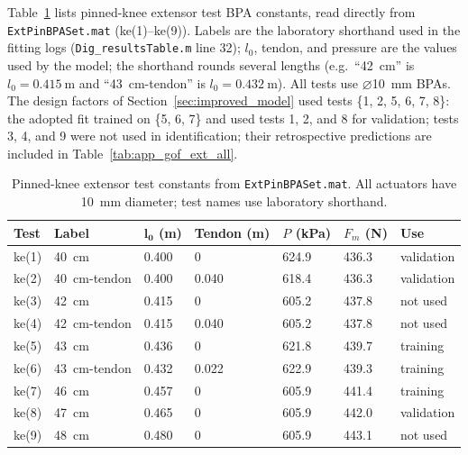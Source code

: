 Table~\ref{tab:app_extpin_tests} lists pinned-knee extensor test BPA constants, read directly from \nolinkurl{ExtPinBPASet.mat} (ke(1)--ke(9)). Labels are the laboratory shorthand used in the fitting logs (\nolinkurl{Dig_resultsTable.m} line 32); $l_{0}$, tendon, and pressure are the values used by the model; the shorthand rounds several lengths (e.g.\ ``\qty{42}{\cm}'' is $l_{0}=\qty{0.415}{\meter}$ and ``\qty{43}{\cm}-tendon'' is $l_{0}=\qty{0.432}{\meter}$). All tests use $\diameter$\qty{10}{\mm} BPAs. The design factors of Section~\ref{sec:improved_model} used tests \{1, 2, 5, 6, 7, 8\}: the adopted fit trained on \{5, 6, 7\} and used tests 1, 2, and 8 for validation; tests 3, 4, and 9 were not used in identification; their retrospective predictions are included in Table~\ref{tab:app_gof_ext_all}.

\begin{table}[htbp]
\caption{Pinned-knee extensor test constants from \nolinkurl{ExtPinBPASet.mat}. All actuators have \qty{10}{\mm} diameter; test names use laboratory shorthand.}
\label{tab:app_extpin_tests}
\begin{tabular}{@{}lllllll@{}}
\toprule
\textbf{Test} & \textbf{Label} & $\boldsymbol{l_{0}}$ (\unit{\meter}) & Tendon (\unit{\meter}) & $P$ (\unit{\kPa}) & $F_{m}$ (\unit{\newton}) & \textbf{Use} \\
\midrule
ke(1) & \qty{40}{\cm}          & 0.400 & 0     & 624.9 & 436.3 & validation \\
ke(2) & \qty{40}{\cm}-tendon   & 0.400 & 0.040 & 618.4 & 436.3 & validation \\
ke(3) & \qty{42}{\cm}          & 0.415 & 0     & 605.2 & 437.8 & not used \\
ke(4) & \qty{42}{\cm}-tendon   & 0.415 & 0.040 & 605.2 & 437.8 & not used \\
ke(5) & \qty{43}{\cm}          & 0.436 & 0     & 621.8 & 439.7 & training \\
ke(6) & \qty{43}{\cm}-tendon   & 0.432 & 0.022 & 622.9 & 439.3 & training \\
ke(7) & \qty{46}{\cm}          & 0.457 & 0     & 605.9 & 441.4 & training \\
ke(8) & \qty{47}{\cm}          & 0.465 & 0     & 605.9 & 442.0 & validation \\
ke(9) & \qty{48}{\cm}          & 0.480 & 0     & 605.9 & 443.1 & not used \\
\bottomrule
\end{tabular}
\end{table}

